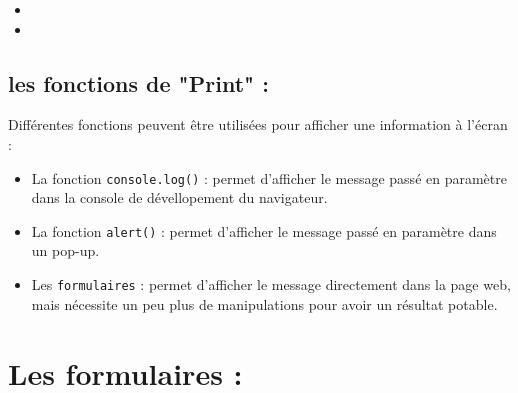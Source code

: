 \documentclass[a4paper, 11pt]{scrartcl}
\begin{document}
\begin{itemize}
\item 
\item
\end{itemize}


\subsection{les fonctions de "Print" :}

Différentes fonctions peuvent être utilisées pour afficher une information à l'écran :
\begin{itemize}
\item La fonction \texttt{console.log()} : permet d'afficher le message passé en paramètre dans la console de dévellopement du navigateur.
\item La fonction \texttt{alert()} : permet d'afficher le message passé en paramètre dans un pop-up.
\item Les \texttt{formulaires} : permet d'afficher le message directement dans la page web, mais nécessite un peu plus de manipulations pour avoir un résultat potable.
\end{itemize}

\section{Les formulaires :}
\end{document}
